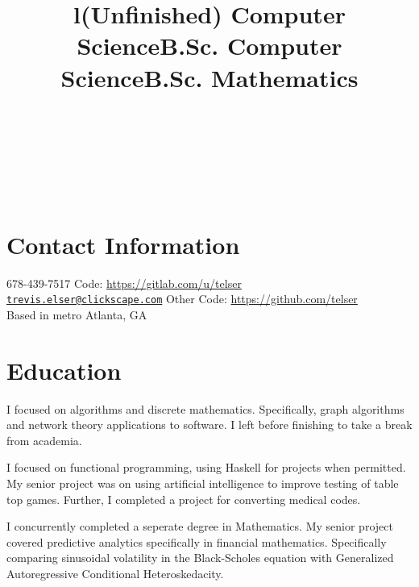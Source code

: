 \documentclass[margintitle,line]{res}
\begin{document}

\begin{resume}

\begin{format}
\\
\title{l}\\
\body\\
\end{format}

\section{Contact Information}

678-439-7517  \hfill {Code:}
\href{https://gitlab.com/u/telser}{https://gitlab.com/u/telser}  \\
\href{mailto:trevis.elser@clickscape.com}{\nolinkurl{trevis.elser@clickscape.com}} \hfill {Other Code:} \href{https://github.com/telser}{https://github.com/telser} \\
Based in metro Atlanta, GA

\section{Education}

\title{(Unfinished) Computer Science}
\begin{position}
I focused on algorithms and discrete mathematics. Specifically, graph
algorithms and network theory applications to software. I left before
finishing to take a break from academia.
\end{position}

\title{B.Sc. Computer Science}
\begin{position}
I focused on functional programming, using Haskell for projects when
permitted. My senior project was on using artificial intelligence to
improve testing of table top games. Further, I completed a project for
converting medical codes.
\end{position}

\title{B.Sc. Mathematics}
\begin{position}
I concurrently completed a seperate degree in Mathematics. My senior
project covered predictive analytics specifically in financial
mathematics. Specifically comparing sinusoidal volatility in the
Black-Scholes equation with Generalized Autoregressive Conditional
Heteroskedacity.
\end{position}


\end{resume}
\end{document}
